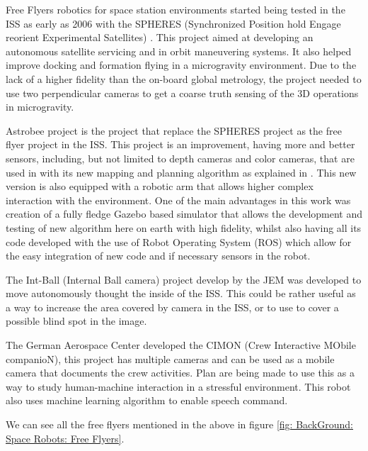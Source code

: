 Free Flyers robotics for space station environments started being tested in the ISS as early as 2006 with the SPHERES (Synchronized Position hold Engage reorient Experimental Satellites) \cite{mohan2009spheres}. This project aimed at developing an autonomous satellite servicing and in orbit maneuvering systems. It also helped improve docking and formation flying in a microgravity environment. Due to the lack of a higher fidelity than the on-board global metrology, the project needed to use two perpendicular cameras to get a coarse truth sensing of the 3D operations in microgravity.

Astrobee project \cite{bualat2015astrobee} is the project that replace the SPHERES project as the free flyer project in the ISS. This project is an improvement, having more and better sensors, including, but not limited to depth cameras and color cameras, that are used in with its new mapping and planning algorithm as explained in \cite{fluckiger2018astrobee}. This new version is also equipped with a robotic arm that allows higher complex interaction with the environment. One of the main advantages in this work was creation of a fully fledge Gazebo based simulator that allows the development and testing of new algorithm here on earth with high fidelity, whilst also having all its code developed with the use of Robot Operating System (ROS) which allow for the easy integration of new code and if necessary sensors in the robot.

The Int-Ball (Internal Ball camera) project develop by the JEM \cite{mitani2019intball} was developed to move autonomously thought the inside of the ISS. This could be rather useful as a way to increase the area covered by camera in the ISS, or to use to cover a possible blind spot in the image.

The German Aerospace Center developed the CIMON (Crew Interactive MObile companioN)\cite{DLR2018}, this project has multiple cameras and can be used as a mobile camera that documents the crew activities. Plan are being made to use this as a way to study human-machine interaction in a stressful environment. This robot also uses machine learning algorithm to enable speech command. 

We can see all the free flyers mentioned in the above in figure \ref{fig: BackGround: Space Robots: Free Flyers}.

